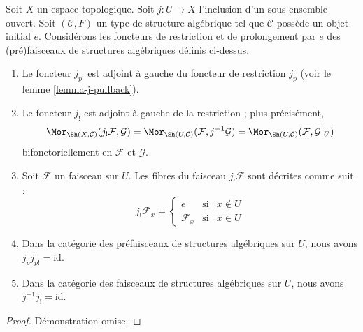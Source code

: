 \begin{lemma}
\label{lemma-j-shriek-structures}
Soit $X$ un espace topologique.
Soit $j : U \to X$ l'inclusion d'un sous-ensemble ouvert.
Soit $(\mathcal{C}, F)$ un type de structure algébrique
tel que $\mathcal{C}$ possède un objet initial $e$.
Considérons les foncteurs de restriction et de prolongement
par $e$ des (pré)faisceaux de structures algébriques définis ci-dessus.
\begin{enumerate}
\item Le foncteur $j_{p!}$ est adjoint à gauche du
foncteur de restriction $j_p$ (voir le lemme \ref{lemma-j-pullback}).
\item Le foncteur $j_!$ est adjoint à gauche de la restriction ;
plus précisément,
$$
\Mor_{\Sh(X, \mathcal{C})}(j_!\mathcal{F}, \mathcal{G})
=
\Mor_{\Sh(U, \mathcal{C})}(\mathcal{F}, j^{-1}\mathcal{G})
=
\Mor_{\Sh(U, \mathcal{C})}(\mathcal{F}, \mathcal{G}|_U)
$$
bifonctoriellement en $\mathcal{F}$ et $\mathcal{G}$.
\item Soit $\mathcal{F}$ un faisceau sur $U$.
Les fibres du faisceau $j_!\mathcal{F}$ sont décrites
comme suit :
$$
j_{!}\mathcal{F}_x =
\left\{
\begin{matrix}
e & \text{si} & x \not \in U \\
\mathcal{F}_x & \text{si} & x \in U
\end{matrix}
\right.
$$
\item Dans la catégorie des préfaisceaux de structures algébriques sur $U$,
nous avons $j_pj_{p!} = \text{id}$.
\item Dans la catégorie des faisceaux de structures algébriques sur $U$,
nous avons $j^{-1}j_! = \text{id}$.
\end{enumerate}
\end{lemma}

\begin{proof}
Démonstration omise.
\end{proof}


